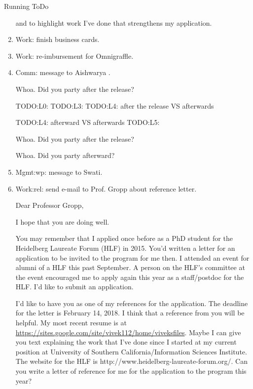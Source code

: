 \begin{columns}
\begin{column}{0.6\linewidth}
\begin{block}{Running ToDo}
\begin{enumerate}
and to highlight work I’ve done that strengthens my application.



\item \tiny Work: finish business cards. 

\item \tiny Work: re-imbursement for Omnigraffle. 

      \item \tiny Comm: message to Aishwarya . 

       
        Whoa. Did you party after the release?


        TODO:L0: 
        TODO:L3: 
        TODO:L4: after the release VS afterwards 

        TODO:L4: afterward VS afterwards 
        TODO:L5: 
        
        Whoa. Did you party after the release? 

        Whoa. Did you party afterward? 

      \item \tiny Mgmt:wp: message to Swati. 

      \item \tiny Work:rel: send e-mail to Prof. Gropp about reference letter. 
         
        Dear Professor Gropp, 

        I hope that you are doing well. 

        You may remember that I applied once before as a PhD student
        for the Heidelberg Laureate Forum (HLF) in 2015. You’d written a letter
        for an application to be invited to the program for me then. I
        attended an event for alumni of a HLF this past
        September. A person on the HLF's committee at the event
        encouraged me to apply again this year as a
        staff/postdoc for the HLF. I'd like to
        submit an application.

        I'd like to have you as one of my references for the
        application. The deadline for the letter is February 14,
        2018. I think that a reference from you will be
        helpful. My most recent resume is at \url{https://sites.google.com/site/vivek112/home/viveksfiles}. 
        Maybe I can give you text explaining the work that I've done since I
        started at my current position at University of Southern California/Information Sciences
        Institute. The website for the HLF is
        http://www.heidelberg-laureate-forum.org/. Can you write a letter of reference for me for the
        application to the program this year?


\end{enumerate}
\end{block}
\end{column}
\end{columns}
